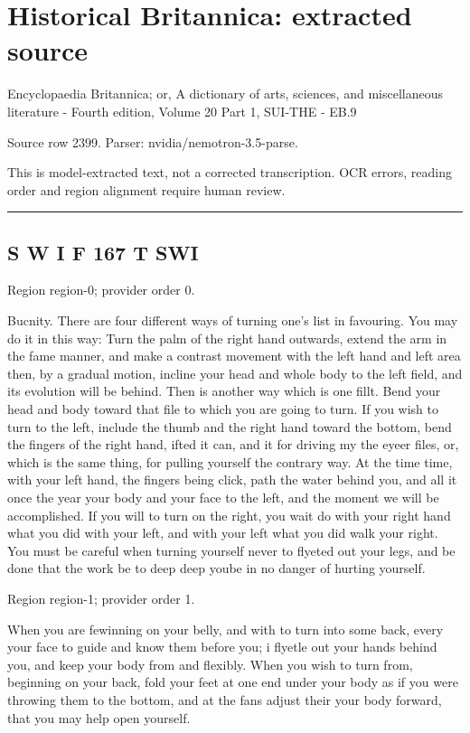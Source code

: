 \documentclass[11pt]{article}
\begin{document}
\section*{Historical Britannica: extracted source}
Encyclopaedia Britannica; or, A dictionary of arts, sciences, and miscellaneous literature - Fourth edition, Volume 20 Part 1, SUI-THE - EB.9\par
{\small Source row 2399. Parser: nvidia/nemotron-3.5-parse.\par}
{\small This is model-extracted text, not a corrected transcription. OCR errors, reading order and region alignment require human review.\par}
\hrule\medskip
\subsection*{S W I F 167 T SWI}

{\scriptsize\color{gray} Region region-0; provider order 0.\par}
\medskip

Bucnity. There are four different ways of turning one’s list in favouring. You may do it in this way: Turn the palm of the right hand outwards, extend the arm in the fame manner, and make a contrast movement with the left hand and left area then, by a gradual motion, incline your head and whole body to the left field, and its evolution will be behind. Then is another way which is one fillt. Bend your head and body toward that file to which you are going to turn. If you wish to turn to the left, include the thumb and the right hand toward the bottom, bend the fingers of the right hand, ifted it can, and it for driving my the eyeer files, or, which is the same thing, for pulling yourself the contrary way. At the time time, with your left hand, the fingers being click, path the water behind you, and all it once the year your body and your face to the left, and the moment we will be accomplished. If you will to turn on the right, you wait do with your right hand what you did with your left, and with your left what you did walk your right. You must be careful when turning yourself never to flyeted out your legs, and be done that the work be to deep deep yoube in no danger of hurting yourself.
\par

{\scriptsize\color{gray} Region region-1; provider order 1.\par}
\medskip

When you are fewinning on your belly, and with to turn into some back, every your face to guide and know them before you; i flyetle out your hands behind you, and keep your body from and flexibly. When you wish to turn from, beginning on your back, fold your feet at one end under your body as if you were throwing them to the bottom, and at the fans adjust their your body forward, that you may help open yourself.
\par
\end{document}
